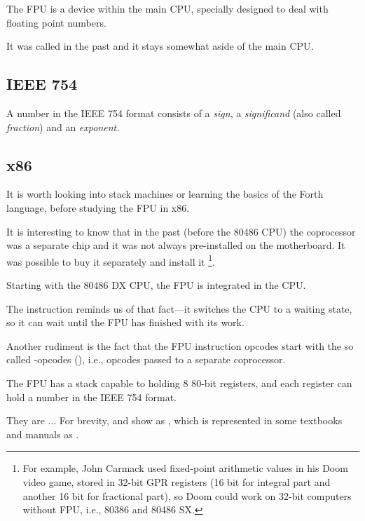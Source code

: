 \mysection{\FPUChapterName}
\label{sec:FPU}

The \ac{FPU} is a device within the main \ac{CPU}, specially designed to deal with floating point numbers.

It was called  in the past and it stays somewhat aside of the main \ac{CPU}.

\subsection{IEEE 754}

A number in the IEEE 754 format consists of a \emph{sign}, a \emph{significand} (also called \emph{fraction}) and an \emph{exponent}.

\subsection{x86}

It is worth looking into stack machines or learning the basics of the Forth language,
before studying the \ac{FPU} in x86.

It is interesting to know that in the past (before the 80486 CPU) the coprocessor was a separate chip 
and it was not always pre-installed on the motherboard. It was possible to buy it separately and install it
\footnote{For example, John Carmack used fixed-point arithmetic 
values in his Doom video game, stored in 
32-bit \ac{GPR} registers (16 bit for integral part and another 16 bit for fractional part), so Doom
could work on 32-bit computers without FPU, i.e., 80386 and 80486 SX.}.

Starting with the 80486 DX CPU, the \ac{FPU} is integrated in the \ac{CPU}.

The  instruction reminds us of that fact---it switches the \ac{CPU} to a waiting state, so it can wait until the \ac{FPU} has finished with its work.

Another rudiment is the fact that the \ac{FPU} instruction 
opcodes start with the so called -opcodes (), i.e., 
opcodes passed to a separate coprocessor.

\label{FPU_is_stack}

The FPU has a stack capable to holding 8 80-bit registers, and each register can hold a number 
in the IEEE 754 format.

They are ... For brevity, \IDA and \olly show  as , 
which is represented in some textbooks and manuals as .

